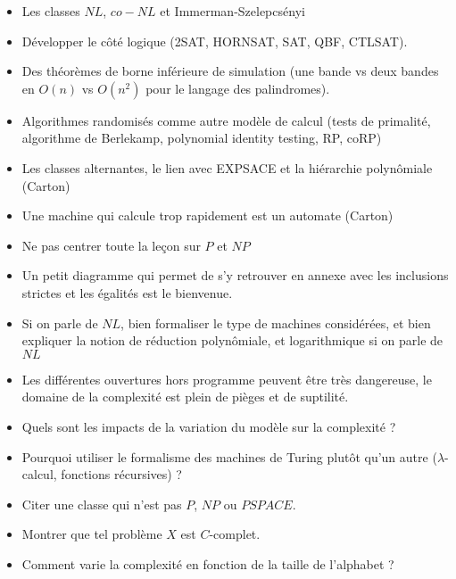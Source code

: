 \documentclass{agregfiche}
\begin{document}
\secidees

\begin{itemize}
    \item Les classes $NL$, $co-NL$ et Immerman-Szelepcsényi
    \item Développer le côté logique (2SAT, HORNSAT, SAT, QBF, CTLSAT).
    \item Des théorèmes de borne inférieure de simulation
(une bande vs deux bandes en $O(n)$ vs $O(n^2)$ 
pour le langage des palindromes).
    \item Algorithmes randomisés comme autre modèle de calcul
        (tests de primalité, algorithme de Berlekamp,
        polynomial identity testing, RP, coRP)
    \item Les classes alternantes, le lien avec 
        EXPSACE et la hiérarchie polynômiale (Carton)   
    \item Une machine qui calcule trop rapidement est un automate 
        (Carton)
\end{itemize}

\secpieges

\begin{itemize}
    \item Ne pas centrer toute la leçon sur $P$ et $NP$
  	\item Un petit diagramme qui permet de s'y retrouver 
    en annexe avec les inclusions strictes et les égalités est le bienvenue.
    \item Si on parle de $NL$, bien formaliser le type de machines 
        considérées,  et bien expliquer la notion de réduction polynômiale,
        et logarithmique si on parle de $NL$
    \item Les différentes ouvertures hors programme peuvent être très dangereuse, le domaine de la complexité est plein de pièges et de suptilité.

\end{itemize}


\secquestionsclassiques

\begin{itemize}
    \item Quels sont les impacts de la variation du modèle sur la complexité ?
    \item Pourquoi utiliser le formalisme des machines de Turing 
        plutôt qu'un autre ($\lambda$-calcul, fonctions récursives) ?
    \item Citer une classe qui n'est pas $P$, $NP$ ou $PSPACE$.
    \item Montrer que tel problème $X$ est $C$-complet.
    \item Comment varie la complexité en fonction de la taille de l'alphabet ?
\end{itemize}
\end{document}
